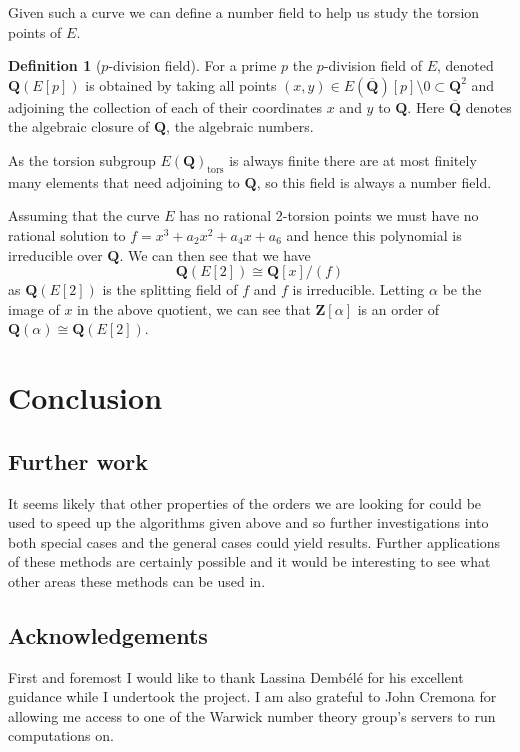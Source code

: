 \documentclass[12pt,a4paper,abstracton,bibtotoc]{scrreprt}
\theoremstyle{definition}
\newtheorem{defn}{Definition}
\newcommand{\QQ}{\mathbf{Q}}
\newcommand{\ZZ}{\mathbf{Z}}
\begin{document}
Given such a curve we can define a number field to help us study the torsion points of $E$.
\begin{defn}[$p$-division field] %
For a prime $p$ the $p$-division field of $E$, denoted $\QQ(E[p])$ is obtained by taking all points $(x,y) \in E(\overline{\QQ})[p]\setminus 0\subset \QQ^2$ and adjoining the collection of each of their coordinates $x$ and $y$ to $\QQ$.
Here $\overline{\QQ}$ denotes the algebraic closure of $\QQ$, the algebraic numbers. %
\end{defn}
As the torsion subgroup $E(\QQ)_\text{tors}$ is always finite there are at most finitely many elements that need adjoining to $\QQ$, so this field is always a number field.

\minisec{}
Assuming that the curve $E$ has no rational 2-torsion points we must have no rational solution to $f = x^3 + a_2x^2 + a_4x + a_6$ and hence this polynomial is irreducible over $\QQ$.
We can then see that we have
\[
\QQ(E[2]) \cong \QQ[x]/(f)
\]
as $\QQ(E[2])$ is the splitting field of $f$ and $f$ is irreducible.
Letting $\alpha$ be the image of $x$ in the above quotient, we can see that $ \ZZ[\alpha]$ is an order of $\QQ(\alpha)\cong \QQ(E[2])$.


\chapter{Conclusion}

\section{Further work}
It seems likely that other properties of the orders we are looking for could be used to speed up the algorithms given above and so further investigations into both special cases and the general cases could yield results.
Further applications of these methods are certainly possible and it would be interesting to see what other areas these methods can be used in.


\section{Acknowledgements}
First and foremost I would like to thank Lassina Demb\'el\'e for his excellent guidance while I undertook the project.
I am also grateful to John Cremona for allowing me access to one of the Warwick number theory group's servers to run computations on.
\end{document}

